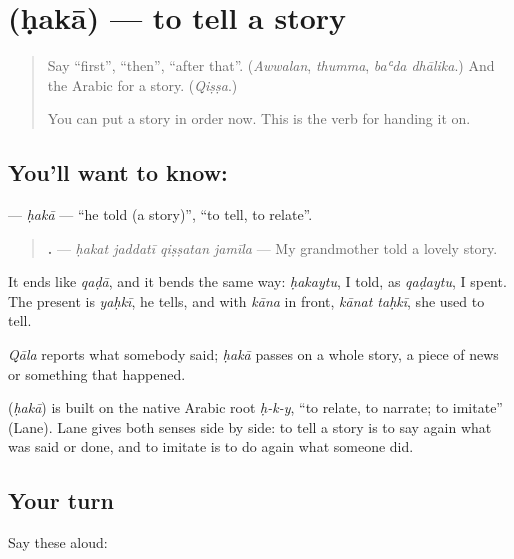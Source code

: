 \section[\texorpdfstring{\ar{حكى} (ḥakā)}{حكى (ḥakā)}]{ (ḥakā) — to tell a story}

\label{lesson:AR-C284-haka}



\begin{quote}
Say \textquotedblleft{}first\textquotedblright{}, \textquotedblleft{}then\textquotedblright{}, \textquotedblleft{}after that\textquotedblright{}. (\emph{Awwalan}, \emph{thumma}, \emph{baʿda dhālika}.) And the Arabic for a story. (\emph{Qiṣṣa}.)

You can put a story in order now. This is the verb for handing it on.
\end{quote}

\subsection*{You'll want to know: }
\textbf{} — \emph{ḥakā} — \textquotedblleft{}he told (a story)\textquotedblright{}, \textquotedblleft{}to tell, to relate\textquotedblright{}.

\begin{quote}
\textbf{   .} — \emph{ḥakat jaddatī qiṣṣatan jamīla} — My grandmother told a lovely story.
\end{quote}

It ends like \emph{qaḍā}, and it bends the same way: \emph{ḥakaytu}, I told, as \emph{qaḍaytu}, I spent. The present is \emph{yaḥkī}, he tells, and with \emph{kāna} in front, \emph{kānat taḥkī}, she used to tell.

\emph{Qāla} reports what somebody said; \emph{ḥakā} passes on a whole story, a piece of news or something that happened.

\begin{cousinweb}
\textbf{} (\emph{ḥakā}) is built on the native Arabic root \emph{ḥ-k-y}, \textquotedblleft{}to relate, to narrate; to imitate\textquotedblright{} (Lane). Lane gives both senses side by side: to tell a story is to say again what was said or done, and to imitate is to do again what someone did.
\end{cousinweb}

\subsection*{Your turn}
Say these aloud:

